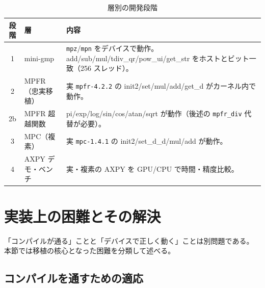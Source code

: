 \documentclass[uplatex,dvipdfmx,a4paper,11pt]{jsarticle}
\newcommand{\code}[1]{\texttt{#1}}
\begin{document}
\begin{table}[h]
\centering
\caption{層別の開発段階}
\begin{tabular}{clp{7.5cm}}
\toprule
段階 & 層 & 内容 \\
\midrule
1  & mini-gmp & \code{mpz}/\code{mpn} をデバイスで動作。add/sub/mul/tdiv\_qr/pow\_ui/get\_str をホストとビット一致（256 スレッド）。\\
2  & MPFR（忠実移植）& 実 \code{mpfr-4.2.2} の init2/set/mul/add/get\_d がカーネル内で動作。\\
2b & MPFR 超越関数 & pi/exp/log/sin/cos/atan/sqrt が動作（後述の \code{mpfr\_div} 代替が必要）。\\
3  & MPC（複素）& 実 \code{mpc-1.4.1} の init2/set\_d\_d/mul/add が動作。\\
4  & AXPY デモ・ベンチ & 実・複素の AXPY を GPU/CPU で時間・精度比較。\\
\bottomrule
\end{tabular}
\end{table}

\section{実装上の困難とその解決}
\label{sec:difficulties}

「コンパイルが通る」ことと「デバイスで正しく動く」ことは別問題である。
本節では移植の核心となった困難を分類して述べる。

\subsection{コンパイルを通すための適応}
\end{document}
